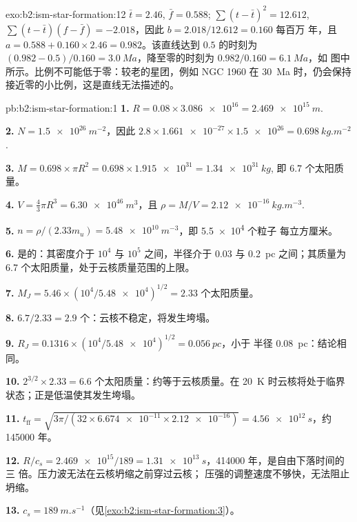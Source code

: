 \begin{solution}{exo:b2:ism-star-formation:12}
$\bar t = 2.46$, $\bar f = 0.588$; $\sum(t - \bar t)^2 = 12.612$,
$\sum(t - \bar t)(f - \bar f) = -2.018$，因此 $b = 2.018/12.612 = 0.160$ 每百万
年，且 $a = 0.588 + 0.160\times2.46 = 0.982$。该直线达到 $0.5$ 的时刻为
$(0.982 - 0.5)/0.160 = \qty{3.0}{Ma}$，降至零的时刻为 $0.982/0.160 = \qty{6.1}{Ma}$，如
图中所示。比例不可能低于零：较老的星团，例如 NGC 1960 在
\qty{30}{Ma} 时，仍会保持接近零的小比例，这是直线无法描述的。
\end{solution}

\begin{solution}{pb:b2:ism-star-formation:1}
\textbf{1.} $R = 0.08\times\num{3.086e16} = \qty{2.469e15}{m}$.

\textbf{2.} $N = \qty{1.5e26}{m^{-2}}$，因此 $2.8\times\num{1.661e-27}\times\num{1.5e26} =
\qty{0.698}{kg.m^{-2}}$.

\textbf{3.} $M = 0.698\times\pi R^2 = 0.698\times\num{1.915e31} = \qty{1.34e31}{kg}$,
即 $6.7$ 个太阳质量。

\textbf{4.} $V = \tfrac43\pi R^3 = \qty{6.30e46}{m^3}$，且
$\rho = M/V = \qty{2.12e-16}{kg.m^{-3}}$.

\textbf{5.} $n = \rho/(2.33m_u) = \qty{5.48e10}{m^{-3}}$，即 \num{5.5e4} 个粒子
每立方厘米。

\textbf{6.} 是的：其密度介于 $10^4$ 与 $10^5$ 之间，半径介于 0.03 与
\qty{0.2}{pc} 之间；其质量为 6.7 个太阳质量，处于云核质量范围的上限。

\textbf{7.} $M_J = 5.46\times(10^4/\num{5.48e4})^{1/2} = 2.33$ 个太阳质量。

\textbf{8.} $6.7/2.33 = 2.9$ 个：云核不稳定，将发生垮塌。

\textbf{9.} $R_J = 0.1316\times(10^4/\num{5.48e4})^{1/2} = \qty{0.056}{pc}$，小于
半径 \qty{0.08}{pc}：结论相同。

\textbf{10.} $2^{3/2}\times2.33 = 6.6$ 个太阳质量：约等于云核质量。在
\qty{20}{K} 时云核将处于临界状态；正是低温使其发生垮塌。

\textbf{11.} $t_{\mathrm{ff}} = \sqrt{3\pi/(32\times\num{6.674e-11}\times\num{2.12e-16})}
= \qty{4.56e12}{s}$，约 \num{145000} 年。

\textbf{12.} $R/c_s = \num{2.469e15}/189 = \qty{1.31e13}{s}$，\num{414000} 年，是自由下落时间的三
倍。压力波无法在云核坍缩之前穿过云核；
压强的调整速度不够快，无法阻止坍缩。

\textbf{13.} $c_s = \qty{189}{m.s^{-1}}$（见\cref{exo:b2:ism-star-formation:3}）。


\end{solution}
